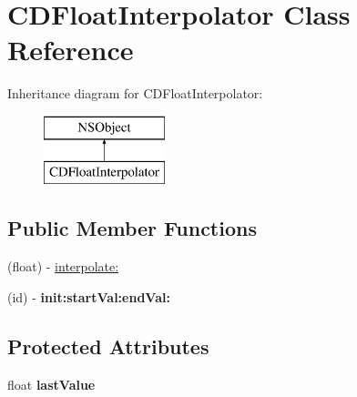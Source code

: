 \hypertarget{interface_c_d_float_interpolator}{\section{C\-D\-Float\-Interpolator Class Reference}
\label{interface_c_d_float_interpolator}
}
Inheritance diagram for C\-D\-Float\-Interpolator\-:\begin{figure}[H]
\begin{center}
\leavevmode
\includegraphics[height=2.000000cm]{interface_c_d_float_interpolator}
\end{center}
\end{figure}
\subsection*{Public Member Functions}
\begin{DoxyCompactItemize}
\item 
(float) -\/ \hyperlink{interface_c_d_float_interpolator_a0eff31af0006d4602c728fc6fbd7e755}{interpolate\-:}
\item 
\hypertarget{interface_c_d_float_interpolator_a7db787f9df34d63c29ca335deb744a87}{(id) -\/ {\bfseries init\-:start\-Val\-:end\-Val\-:}}\label{interface_c_d_float_interpolator_a7db787f9df34d63c29ca335deb744a87}

\end{DoxyCompactItemize}
\subsection*{Protected Attributes}
\begin{DoxyCompactItemize}
\item 
\hypertarget{interface_c_d_float_interpolator_aef38c90b94696fcdd93a0e399c04a3a7}{float {\bfseries last\-Value}}\label{interface_c_d_float_interpolator_aef38c90b94696fcdd93a0e399c04a3a7}

\end{DoxyCompactItemize}
